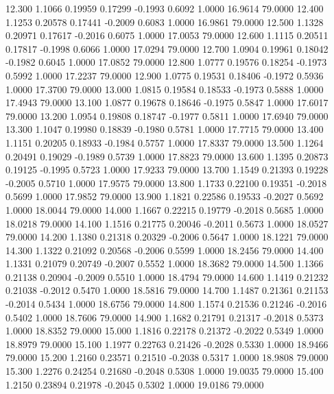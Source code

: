   12.300   1.1066   0.19959   0.17299  -0.1993   0.6092   1.0000  16.9614  79.0000
  12.400   1.1253   0.20578   0.17441  -0.2009   0.6083   1.0000  16.9861  79.0000
  12.500   1.1328   0.20971   0.17617  -0.2016   0.6075   1.0000  17.0053  79.0000
  12.600   1.1115   0.20511   0.17817  -0.1998   0.6066   1.0000  17.0294  79.0000
  12.700   1.0904   0.19961   0.18042  -0.1982   0.6045   1.0000  17.0852  79.0000
  12.800   1.0777   0.19576   0.18254  -0.1973   0.5992   1.0000  17.2237  79.0000
  12.900   1.0775   0.19531   0.18406  -0.1972   0.5936   1.0000  17.3700  79.0000
  13.000   1.0815   0.19584   0.18533  -0.1973   0.5888   1.0000  17.4943  79.0000
  13.100   1.0877   0.19678   0.18646  -0.1975   0.5847   1.0000  17.6017  79.0000
  13.200   1.0954   0.19808   0.18747  -0.1977   0.5811   1.0000  17.6940  79.0000
  13.300   1.1047   0.19980   0.18839  -0.1980   0.5781   1.0000  17.7715  79.0000
  13.400   1.1151   0.20205   0.18933  -0.1984   0.5757   1.0000  17.8337  79.0000
  13.500   1.1264   0.20491   0.19029  -0.1989   0.5739   1.0000  17.8823  79.0000
  13.600   1.1395   0.20873   0.19125  -0.1995   0.5723   1.0000  17.9233  79.0000
  13.700   1.1549   0.21393   0.19228  -0.2005   0.5710   1.0000  17.9575  79.0000
  13.800   1.1733   0.22100   0.19351  -0.2018   0.5699   1.0000  17.9852  79.0000
  13.900   1.1821   0.22586   0.19533  -0.2027   0.5692   1.0000  18.0044  79.0000
  14.000   1.1667   0.22215   0.19779  -0.2018   0.5685   1.0000  18.0218  79.0000
  14.100   1.1516   0.21775   0.20046  -0.2011   0.5673   1.0000  18.0527  79.0000
  14.200   1.1380   0.21318   0.20329  -0.2006   0.5647   1.0000  18.1221  79.0000
  14.300   1.1322   0.21092   0.20568  -0.2006   0.5599   1.0000  18.2456  79.0000
  14.400   1.1331   0.21079   0.20749  -0.2007   0.5552   1.0000  18.3682  79.0000
  14.500   1.1366   0.21138   0.20904  -0.2009   0.5510   1.0000  18.4794  79.0000
  14.600   1.1419   0.21232   0.21038  -0.2012   0.5470   1.0000  18.5816  79.0000
  14.700   1.1487   0.21361   0.21153  -0.2014   0.5434   1.0000  18.6756  79.0000
  14.800   1.1574   0.21536   0.21246  -0.2016   0.5402   1.0000  18.7606  79.0000
  14.900   1.1682   0.21791   0.21317  -0.2018   0.5373   1.0000  18.8352  79.0000
  15.000   1.1816   0.22178   0.21372  -0.2022   0.5349   1.0000  18.8979  79.0000
  15.100   1.1977   0.22763   0.21426  -0.2028   0.5330   1.0000  18.9466  79.0000
  15.200   1.2160   0.23571   0.21510  -0.2038   0.5317   1.0000  18.9808  79.0000
  15.300   1.2276   0.24254   0.21680  -0.2048   0.5308   1.0000  19.0035  79.0000
  15.400   1.2150   0.23894   0.21978  -0.2045   0.5302   1.0000  19.0186  79.0000
